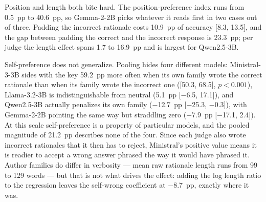 \documentclass[conference]{IEEEtran}
\begin{document}
Position and length both bite hard. The position-preference index runs from 0.5~pp to 40.6~pp, so Gemma-2-2B picks whatever it reads first in two cases out of three. Padding the incorrect rationale costs 10.9~pp of accuracy [8.3, 13.5], and the gap between padding the correct and the incorrect response is 23.3~pp; per judge the length effect spans 1.7 to 16.9~pp and is largest for Qwen2.5-3B.

Self-preference does not generalize. Pooling hides four different models: Ministral-3-3B sides with the key 59.2~pp more often when its own family wrote the correct rationale than when its family wrote the incorrect one ([50.3, 68.5], $p<0.001$), Llama-3.2-3B is indistinguishable from neutral (5.1~pp [$-$6.5, 17.1]), and Qwen2.5-3B actually penalizes its own family ($-$12.7~pp [$-$25.3, $-$0.3]), with Gemma-2-2B pointing the same way but straddling zero ($-$7.9~pp [$-$17.1, 2.4]). At this scale self-preference is a property of particular models, and the pooled magnitude of 21.2~pp describes none of the four. Since each judge also wrote incorrect rationales that it then has to reject, Ministral's positive value means it is readier to accept a wrong answer phrased the way it would have phrased it. Author families do differ in verbosity --- mean raw rationale length runs from 99 to 129 words --- but that is not what drives the effect: adding the log length ratio to the regression leaves the self-wrong coefficient at $-$8.7~pp, exactly where it was.
\end{document}
